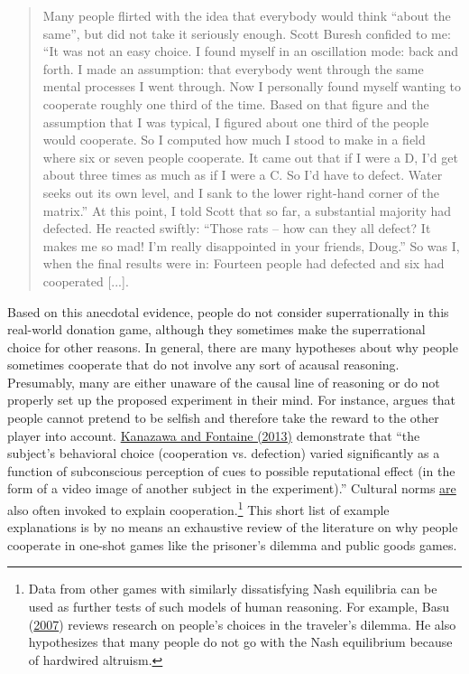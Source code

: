 \begin{quote}
Many people flirted with the idea that everybody would think ``about the
same'', but did not take it seriously enough. Scott Buresh confided to
me: ``It was not an easy choice. I found myself in an oscillation mode:
back and forth. I made an assumption: that everybody went through the
same mental processes I went through. Now I personally found myself
wanting to cooperate roughly one third of the time. Based on that figure
and the assumption that I was typical, I figured about one third of the
people would cooperate. So I computed how much I stood to make in a
field where six or seven people cooperate. It came out that if I were a
D, I'd get about three times as much as if I were a C. So I'd have to
defect. Water seeks out its own level, and I sank to the lower
right-hand corner of the matrix.'' At this point, I told Scott that so
far, a substantial majority had defected. He reacted swiftly: ``Those
rats -- how can they all defect? It makes me so mad! I'm really
disappointed in your friends, Doug.'' So was I, when the final results
were in: Fourteen people had defected and six had cooperated {[}...{]}.
\end{quote}

Based on this anecdotal evidence, people do not consider superrationally
in this real-world donation game, although they sometimes make the
superrational choice for other reasons. In general, there are many
hypotheses about why people sometimes cooperate that do not involve any
sort of acausal reasoning. Presumably, many are either unaware of the
causal line of reasoning or do not properly set up the proposed
experiment in their mind. For instance,  \citet[chatper 275]{Yudkowsky2015-tz} argues that people
cannot pretend to be selfish and therefore take the reward to the other player into account.
\href{http://personal.lse.ac.uk/kanazawa/pdfs/JNPE2013.pdf}{Kanazawa
and Fontaine (2013)} demonstrate that ``the subject's behavioral choice
(cooperation vs. defection) varied significantly as a function of
subconscious perception of cues to possible reputational effect (in the
form of a video image of another subject in the experiment).'' Cultural
norms
\href{https://en.wikipedia.org/wiki/Public_goods_game\#Applications_to_sociology}{are}
also often invoked to explain cooperation.\footnote{Data from other
  games with similarly dissatisfying Nash equilibria can be used as
  further tests of such models of human reasoning. For example, Basu
  (\href{http://www.cs.virginia.edu/~robins/The_Travelers_Dilemma.pdf}{2007})
  reviews research on people's choices in the traveler's dilemma. He
  also hypothesizes that many people do not go with the Nash equilibrium
  because of hardwired altruism.} This short list of example
explanations is by no means an exhaustive review of the literature on
why people cooperate in one-shot games like the prisoner's dilemma and
public goods games.


